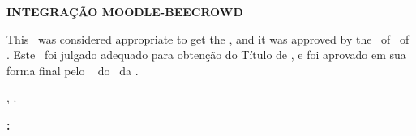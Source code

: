 


\begin{folhadeaprovacao}

    \begin{center}
        {\imprimirautor}

        \begin{center}
            \ABNTEXchapterfont\bfseries\MakeUppercase{Integração Moodle-Beecrowd}\ifnotempty{\imprimirsubtitulo}{: \imprimirsubtitulo}
        \end{center}

        \begin{minipage}{\textwidth}
            \lang
            {
                This \imprimirtipotrabalho~was considered appropriate to get the \imprimirformacao,
                and it was approved by the \imprimirprograma~of \imprimircentro~of \imprimirinstituicao.
            }
            {
                Este \imprimirtipotrabalho~foi julgado adequado para obtenção do Título de \imprimirformacao,
                e foi aprovado em sua forma final pelo \imprimirprograma~
                do \imprimircentro~da \imprimirinstituicao.
            }
         \end{minipage}%
    \end{center}

    \begin{center}
        \imprimirlocal, \imprimirdata.
    \end{center}


    \vspace*{1cm}

    \begin{flushleft}
        \textbf{:}
    \end{flushleft}

    \vspace*{0.5cm}

    \begin{center}
        \assinatura{%
            \textbf{\imprimirorientador} \\ \imprimirorientadorRotulo\\
            \imprimirinstituicao~--~\imprimirinstituicaosigla
        }
        \vspace*{0.5cm}


\end{center}
\end{folhadeaprovacao}
